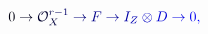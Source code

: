 \documentclass[12pt]{article}
\begin{document}
\makeatletter
\renewcommand*{\@textcolor}[3]{%
  \protect\leavevmode
  \begingroup
    \color#1{#2}#3%
  \endgroup
}
\makeatother
\begin{displaymath}
\mathcolor[RGB]{0,0,15}{0} \mathcolor[RGB]{0,0,30}{\rightarrow} \mathcal { \mathcolor[RGB]{0,0,45}{O} } _ { \mathcolor[RGB]{0,0,60}{X} } ^ { \mathcolor[RGB]{0,0,75}{r} \mathcolor[RGB]{0,0,90}{-} \mathcolor[RGB]{0,0,105}{1} } \mathcolor[RGB]{0,0,120}{\rightarrow} \mathcolor[RGB]{0,0,135}{F} \mathcolor[RGB]{0,0,150}{\rightarrow} \mathcolor[RGB]{0,0,165}{I} _ { \mathcolor[RGB]{0,0,180}{Z} } \mathcolor[RGB]{0,0,195}{\otimes} \mathcolor[RGB]{0,0,210}{D} \mathcolor[RGB]{0,0,225}{\rightarrow} \mathcolor[RGB]{0,0,240}{0} \mathcolor[RGB]{0,0,255}{,}
\end{displaymath}
\end{document}
